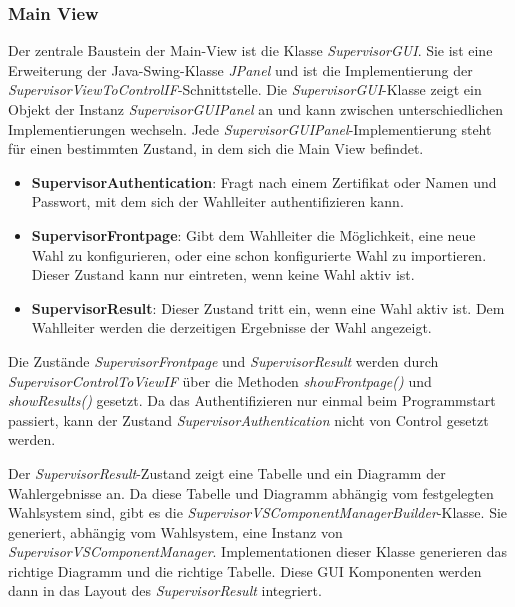 \documentclass[parskip=full]{scrartcl}
\newcommand{\textitx}[1]{\mbox{\textit{#1}}}
\newcommand{\fakeparagraph}[1]{\textbf{#1}}
\begin{document}
		\subsubsection{Main View}
		Der zentrale Baustein der Main-View ist die Klasse \textitx{SupervisorGUI}. Sie ist eine Erweiterung der Java-Swing-Klasse \textit{JPanel} und ist die Implementierung der \textit{SupervisorViewToControlIF}-Schnittstelle. Die \textitx{SupervisorGUI}-Klasse zeigt ein Objekt der Instanz \textitx{SupervisorGUIPanel} an und kann zwischen unterschiedlichen Implementierungen wechseln. Jede \textitx{SupervisorGUIPanel}-Implementierung steht für einen bestimmten Zustand, in dem sich die Main View befindet.
		\begin{itemize}
			\item\fakeparagraph{SupervisorAuthentication}: Fragt nach einem Zertifikat oder Namen und Passwort, mit dem sich der Wahlleiter authentifizieren kann.
			\item\fakeparagraph{SupervisorFrontpage}: Gibt dem Wahlleiter die Möglichkeit, eine neue Wahl zu konfigurieren, oder eine schon konfigurierte Wahl zu importieren. Dieser Zustand kann nur eintreten, wenn keine Wahl aktiv ist.
			\item\fakeparagraph{SupervisorResult}: Dieser Zustand tritt ein, wenn eine Wahl aktiv ist. Dem Wahlleiter werden die derzeitigen Ergebnisse der Wahl angezeigt.
		\end{itemize}
	
		Die Zustände \textitx{SupervisorFrontpage} und \textitx{SupervisorResult} werden durch \textit{SupervisorControlToViewIF} über die Methoden \textitx{showFrontpage()} und \textitx{showResults()} gesetzt. Da das Authentifizieren nur einmal beim Programmstart passiert, kann der Zustand \textit{SupervisorAuthentication} nicht von Control gesetzt werden.
		
		Der \textitx{SupervisorResult}-Zustand zeigt eine Tabelle und ein Diagramm der Wahlergebnisse an. Da diese Tabelle und Diagramm abhängig vom festgelegten Wahlsystem sind, gibt es die \textit{SupervisorVSComponentManagerBuilder}-Klasse. Sie generiert, abhängig vom Wahlsystem, eine Instanz von \textit{SupervisorVSComponentManager}. Implementationen dieser Klasse generieren das richtige Diagramm und die richtige Tabelle. Diese GUI Komponenten werden dann in das Layout des \textitx{SupervisorResult} integriert.
		
\end{document}

